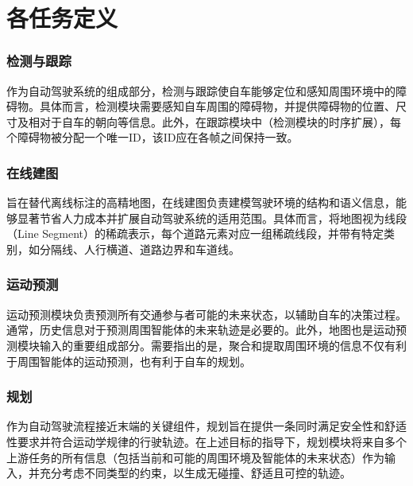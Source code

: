 \section{各任务定义}
\label{appendix-definition}

\subsubsection{检测与跟踪}

作为自动驾驶系统的组成部分，检测与跟踪使自车能够定位和感知周围环境中的障碍物。具体而言，检测模块需要感知自车周围的障碍物，并提供障碍物的位置、尺寸及相对于自车的朝向等信息。此外，在跟踪模块中（检测模块的时序扩展），每个障碍物被分配一个唯一ID，该ID应在各帧之间保持一致。

\subsubsection{在线建图}

旨在替代离线标注的高精地图，在线建图负责建模驾驶环境的结构和语义信息，能够显著节省人力成本并扩展自动驾驶系统的适用范围。具体而言，将地图视为线段（Line Segment）的稀疏表示，每个道路元素对应一组稀疏线段，并带有特定类别，如分隔线、人行横道、道路边界和车道线。

\subsubsection{运动预测}

运动预测模块负责预测所有交通参与者可能的未来状态，以辅助自车的决策过程。通常，历史信息对于预测周围智能体的未来轨迹是必要的。此外，地图也是运动预测模块输入的重要组成部分。需要指出的是，聚合和提取周围环境的信息不仅有利于周围智能体的运动预测，也有利于自车的规划。

\subsubsection{规划}

作为自动驾驶流程接近末端的关键组件，规划旨在提供一条同时满足安全性和舒适性要求并符合运动学规律的行驶轨迹。在上述目标的指导下，规划模块将来自多个上游任务的所有信息（包括当前和可能的周围环境及智能体的未来状态）作为输入，并充分考虑不同类型的约束，以生成无碰撞、舒适且可控的轨迹。
